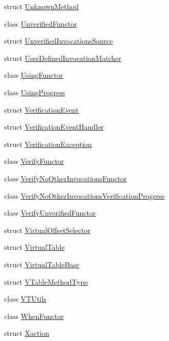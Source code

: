 \begin{DoxyCompactItemize}
\item 
struct \mbox{\hyperlink{structfakeit_1_1UnknownMethod}{Unknown\+Method}}
\item 
class \mbox{\hyperlink{classfakeit_1_1UnverifiedFunctor}{Unverified\+Functor}}
\item 
struct \mbox{\hyperlink{structfakeit_1_1UnverifiedInvocationsSource}{Unverified\+Invocations\+Source}}
\item 
struct \mbox{\hyperlink{structfakeit_1_1UserDefinedInvocationMatcher}{User\+Defined\+Invocation\+Matcher}}
\item 
class \mbox{\hyperlink{classfakeit_1_1UsingFunctor}{Using\+Functor}}
\item 
class \mbox{\hyperlink{classfakeit_1_1UsingProgress}{Using\+Progress}}
\item 
struct \mbox{\hyperlink{structfakeit_1_1VerificationEvent}{Verification\+Event}}
\item 
struct \mbox{\hyperlink{structfakeit_1_1VerificationEventHandler}{Verification\+Event\+Handler}}
\item 
struct \mbox{\hyperlink{structfakeit_1_1VerificationException}{Verification\+Exception}}
\item 
class \mbox{\hyperlink{classfakeit_1_1VerifyFunctor}{Verify\+Functor}}
\item 
class \mbox{\hyperlink{classfakeit_1_1VerifyNoOtherInvocationsFunctor}{Verify\+No\+Other\+Invocations\+Functor}}
\item 
class \mbox{\hyperlink{classfakeit_1_1VerifyNoOtherInvocationsVerificationProgress}{Verify\+No\+Other\+Invocations\+Verification\+Progress}}
\item 
class \mbox{\hyperlink{classfakeit_1_1VerifyUnverifiedFunctor}{Verify\+Unverified\+Functor}}
\item 
struct \mbox{\hyperlink{structfakeit_1_1VirtualOffsetSelector}{Virtual\+Offset\+Selector}}
\item 
struct \mbox{\hyperlink{structfakeit_1_1VirtualTable}{Virtual\+Table}}
\item 
struct \mbox{\hyperlink{structfakeit_1_1VirtualTableBase}{Virtual\+Table\+Base}}
\item 
struct \mbox{\hyperlink{structfakeit_1_1VTableMethodType}{V\+Table\+Method\+Type}}
\item 
class \mbox{\hyperlink{classfakeit_1_1VTUtils}{V\+T\+Utils}}
\item 
class \mbox{\hyperlink{classfakeit_1_1WhenFunctor}{When\+Functor}}
\item 
struct \mbox{\hyperlink{structfakeit_1_1Xaction}{Xaction}}
\end{DoxyCompactItemize}
